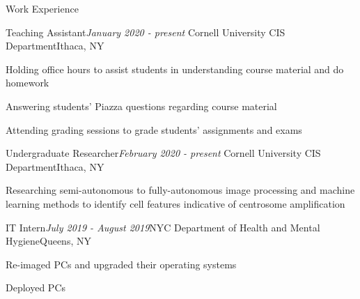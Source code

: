 \documentclass{resume} %
\begin{document}





%
%
%


\begin{rSection}{Work Experience}

\begin{rSubsection}{Teaching Assistant}{\em January 2020 - present }{Cornell University CIS Department}{Ithaca, NY}
\item Holding office hours to assist students in understanding course material and do homework
\item Answering students' Piazza questions regarding course material
\item Attending grading sessions to grade students' assignments and exams
\end{rSubsection}

\begin{rSubsection}{Undergraduate Researcher}{\em February 2020 - present }{Cornell University CIS Department}{Ithaca, NY}
\item Researching semi-autonomous to fully-autonomous image processing and machine learning methods to identify cell features indicative of centrosome amplification
\end{rSubsection}

\begin{rSubsection}{IT Intern}{\em July 2019 - August 2019}{NYC Department of Health and Mental Hygiene}{Queens, NY}
\item Re-imaged PCs and upgraded their operating systems
\item Deployed PCs
\end{rSubsection}

\end{rSection}
\end{document}
